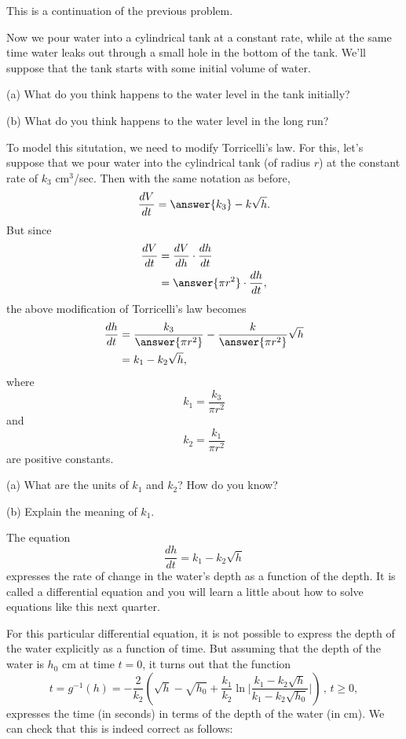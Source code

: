\documentclass{ximera}
\begin{document}
\begin{question}  \label{Q:435gbbrtgt}
This is a continuation of the previous problem.

Now we pour water into a cylindrical tank at a constant rate, while at the same time water leaks out through a small hole in the bottom of the tank. We'll suppose that the tank starts with some initial volume of water.

\begin{freeResponse}

(a) What do you think happens to the water level in the tank initially?

(b) What do you think happens to the water level in the long run?

\end{freeResponse}

To model this situtation, we need to modify Torricelli's law. For this, let's suppose that we pour water into the cylindrical tank (of radius $r$) at the constant rate of $k_3 \text{ cm}^3$/sec. Then with the same notation as before,
\[
      \frac{dV}{dt} = \answer{k_3} - k\sqrt{h} . 
\] 
But since 
\begin{align*}
        \frac{dV}{dt} &= \frac{dV}{dh} \cdot \frac{dh}{dt}   \\
                            & = \answer{\pi r^2} \cdot \frac{dh}{dt} ,
\end{align*}
the above modification of Torricelli's law becomes
\begin{align*}
    \frac{dh}{dt} &=  \frac{k_3}{\answer{\pi r^2}} - \frac{k}{\answer{\pi r^2}}\sqrt{h} \\
                        &= k_1 - k_2 \sqrt{h} ,
\end{align*}
where 
\[
    k_1  = \frac{k_3}{\pi r^2} 
\]
and
\[
        k_2 = \frac{k_1}{\pi r^2} 
\]
are positive constants. 

\begin{freeResponse}
(a) What are the units of $k_1$ and $k_2$? How do you know?

(b) Explain the meaning of $k_1$.
\end{freeResponse}

The equation
\[
   \frac{dh}{dt} =  k_1 - k_2 \sqrt{h} 
\]
expresses the rate of change in the water's depth as a function of the depth. It is called a differential equation and you will learn a little about how to solve equations like this next quarter. 
 
For this particular differential equation, it is not possible to express the depth of the water explicitly as a function of time. But assuming that the depth of the water is $h_0$ cm at time $t=0$, it turns out that the function 
\[
      t = g^{-1}(h) = - \frac{2}{k_2}  \left( \sqrt{h} - \sqrt{h_0} + \frac{k_1}{k_2} \ln \Bigg| \frac{k_1 - k_2 \sqrt{h}}{k_1 - k_2 \sqrt{h_0}}   \Bigg| \right)\, , \, t\geq 0 ,
\]
expresses the time (in seconds) in terms of the depth of the water (in cm). We can check that this is indeed correct as follows:


\end{question}
\end{document}
